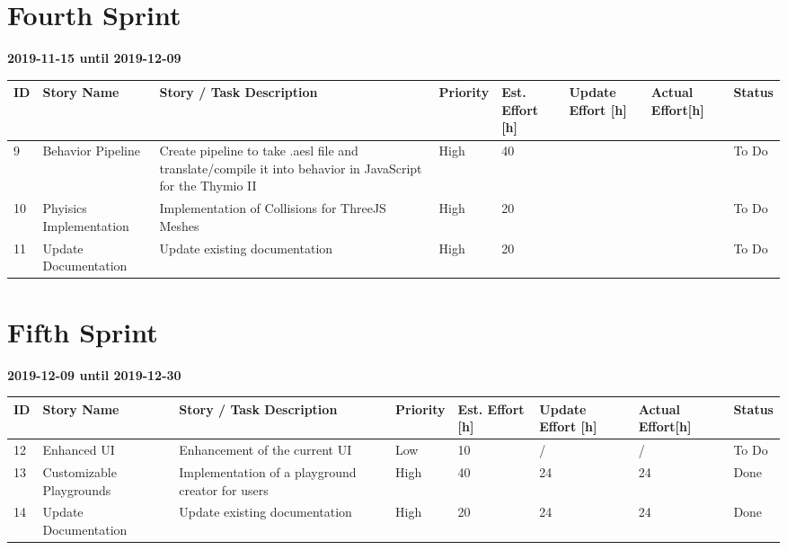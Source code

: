 \documentclass{scrbook}
\begin{document}
\section{Fourth Sprint}
\textbf{2019-11-15 until 2019-12-09}
\begin{longtable}{p{5mm}|p{2cm}|p{4cm}|p{1cm}|p{1cm}|p{1cm}|p{1cm}|p{15mm}}
  ID                     & Story Name & Story / Task Description & Priority & Est. Effort {[}h{]} & Update Effort {[}h{]} & Actual Effort{[}h{]} & Status                \\ \hline
  9 & Behavior Pipeline & Create pipeline to take .aesl file and translate/compile it into behavior in JavaScript for the Thymio II & High & 40 &  &  & To Do \\ 
  10 & Phyisics Implementation & Implementation of Collisions for ThreeJS Meshes & High & 20 &  &  & To Do \\
  11 & Update Documentation & Update existing documentation & High & 20 &  &  & To Do \\ 
\end{longtable}

\section{Fifth Sprint}
\textbf{2019-12-09 until 2019-12-30}
\begin{longtable}{p{5mm}|p{2cm}|p{4cm}|p{1cm}|p{1cm}|p{1cm}|p{1cm}|p{15mm}}
  ID                     & Story Name & Story / Task Description & Priority & Est. Effort {[}h{]} & Update Effort {[}h{]} & Actual Effort{[}h{]} & Status                \\ \hline
  12 & Enhanced UI & Enhancement of the current UI & Low & 10 & {/} & {/} & To Do \\ 
  13 & Customizable Playgrounds & Implementation of a playground creator for users & High & 40 & 24 & 24 & Done \\ 
  14 & Update Documentation & Update existing documentation & High & 20 & 24 & 24 & Done \\ 
\end{longtable}
\end{document}
